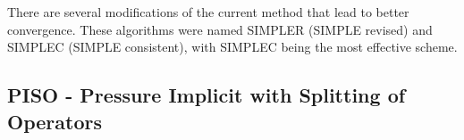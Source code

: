 \documentclass{article}
\begin{document}
There are several modifications of the current method that lead to better convergence.  These algorithms were named SIMPLER (SIMPLE revised) and SIMPLEC (SIMPLE consistent), with SIMPLEC being the most effective scheme. 

\subsection{PISO - Pressure Implicit with Splitting of Operators}
\end{document}
